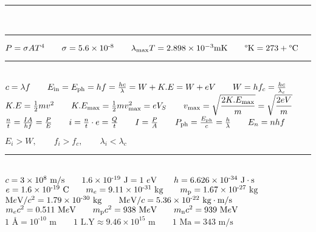 \documentclass[a4paper,12pt]{article}
\newcommand{\sz}{\text{-}}
\begin{document}
{\centering \rule{10cm}{0.8pt}\\\rule[\dimexpr \ht\strutbox+0.1cm]{7cm}{0.8pt} \par}

\noindent
$P = \sigma AT^4 \qquad \sigma = 5.6 \times 10^{\sz8} \qquad \lambda_{\text{max}} T = 2.898 \times 10^{-3} \text{mK} \qquad \degree \text{K} = 273 + \degree \text{C}$

{\centering \rule{10cm}{0.4pt} \par}

\ \\
\noindent
$ c = \lambda f \qquad E_{\text{in}} = E_{\text{ph}} = hf = \frac{hc}{\lambda} = W + K.E = W + eV \qquad W = h f_c = \frac{hc}{\lambda_c} \\[+2mm]$
$ K.E = \frac{1}{2} mv^2 \qquad K.E_{\text{max}} = \frac{1}{2} m v^2_{\text{max}} = eV_S \qquad v_{\text{max}} = \sqrt{\displaystyle \frac{2K.E_{\text{max}}}{m}} = \sqrt{\displaystyle \frac{2eV}{m}}\\[+2mm]$
$ \frac{n}{t} = \frac{IA}{hf} = \frac{P}{E} \qquad i = \frac{n}{t} \cdot e = \frac{Q}{t} \qquad I = \frac{P}{A} \qquad P_{\text{ph}} = \frac{E_\text{ph}}{c} = \frac{h}{\lambda} \qquad E_n = n hf \\$
\begin{center}
    $E_i > W, \qquad f_i > f_c, \qquad \lambda_i < \lambda_c$
\end{center}

{\centering \rule{10cm}{0.4pt} \par}

\ \\
\noindent
$c = 3 \times 10^8 \text{ m}/\text{s} \qquad 1.6\times 10^{\sz 19}\text{ J} = 1 \ e\text{V} \qquad h = 6.626 \times 10^{\sz34} \text{ J} \cdot \text{s}\\[+2mm]$
$e = 1.6 \times 10^{\sz 19} \text{ C} \qquad m_{e} = 9.11 \times 10^{\sz31} \text{ kg} \qquad m_{\text{p}} = 1.67 \times 10^{\sz27} \text{ kg}\\[+2mm]$
$\text{M}e\text{V}/c^2 = 1.79 \times 10^{\sz30} \text{ kg} \qquad \text{M}e\text{V}/c = 5.36 \times 10^{\sz22} \text{ kg}\cdot\text{m}/\text{s}\\[+2mm]$
$m_e c^2 = 0.511 \text{ M}e\text{V} \qquad m_\text{p}c^2 = 938 \text{ M}e\text{V} \qquad m_\text{n}c^2 = 939 \text{ M}e\text{V} \\[+2mm]$
$ 1 \text{ \AA} = 10^{\sz10} \text{ m} \qquad 1 \text{ L.Y} \approx 9.46 \times 10^{15} \text{ m} \qquad 1 \text{ Ma} = 343 \text{ m}/\text{s}$
\end{document}
